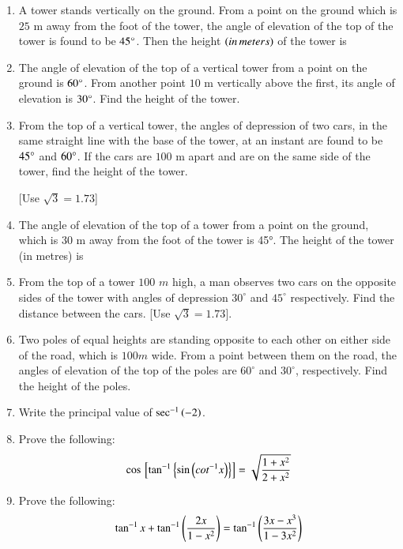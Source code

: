 \begin{enumerate}
\hfill{}
\item A tower stands vertically on the ground. From a point on the ground which is $25$ m away from the foot of the tower, the angle of elevation of the top of the tower is found to be $45\degree$. Then the height $\left(in\,meters\right)$ of the tower is



\hfill{}\item The angle of elevation of the top of a vertical tower from a point on the ground is $60\degree$. From another point $10$ m vertically above the first, its angle of elevation is $30\degree$. Find the height of the tower.


\hfill{}\item From the top of a vertical tower, the angles of depression of two cars, in the same straight line with the base of the tower, at an instant are found to be $45\degree$ and $60\degree$. If the cars are $100$ m apart and are on the same side of the tower, find the height of the tower. 

[Use $\sqrt{3} = 1.73$]
\hfill{}
    \item The angle of elevation of the top of a tower from a point on the ground, which is 30 m away from the foot of the tower is 45°. The height of the tower (in metres) is
    \hfill{}\item From the top of a tower $100$ $m$ high, a man observes two cars on the opposite sides of the tower with angles of depression $30^\circ$ and $45^\circ$ respectively. Find the distance between the cars. [Use $\sqrt{3}=1.73$].
    \hfill{}\item Two poles of equal heights are standing opposite to each other on either side of the road, which is $100m$ wide. From a point between them on the road, the angles of elevation of the top of the poles are $60^\circ$ and $30^\circ$, respectively. Find the height of the poles.
\hfill{}


\item Write the principal value of $\sec^{-1} \left(-2\right)$.

\hfill{}\item Prove the following:
    \begin{align*}
        \cos {}\left[\tan^{-1} \left\{\sin \left(cot^{-1} x\right)\right\}\right] = \sqrt{\frac{1 + x^2}{2 + x^2}}
    \end{align*}

\hfill{}\item Prove the following:
    \begin{align*}
        \tan^{-1} x + \tan^{-1} \left(\frac{2x}{1 - x^2}\right) = \tan^{-1} \left(\frac{3x - x^3}{1 - 3x^2}\right)
    \end{align*}
\hfill{}
\end{enumerate}
